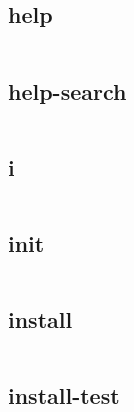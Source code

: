 \begin{lstlisting}[language=bash]

\end{lstlisting}

\subsection{help}



\begin{lstlisting}[language=bash]

\end{lstlisting}

\subsection{help-search}

\begin{lstlisting}[language=bash]

\end{lstlisting}

\subsection{i}


\begin{lstlisting}[language=bash]

\end{lstlisting}

\subsection{init}


\begin{lstlisting}[language=bash]

\end{lstlisting}

\subsection{install}


\begin{lstlisting}[language=bash]

\end{lstlisting}

\subsection{install-test}


